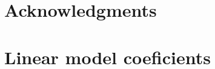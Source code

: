 \documentclass{acm_proc_article_sp}
\begin{document}














%






\section{Acknowledgments}

%

%
%
\newpage
\appendix
\section{Linear model coeficients}
\balancecolumns





\end{document}
